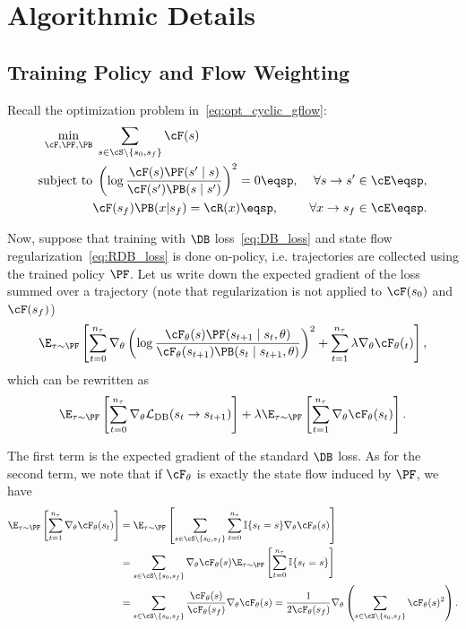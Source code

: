 \section{Algorithmic Details}\label{app:algo_details}

\subsection{Training Policy and Flow Weighting}\label{app:flow_weighting}


Recall the optimization problem in~\eqref{eq:opt_cyclic_gflow}:
\begin{align*}
\label{eq:opt_cyclic_gflow}
\min\limits_{\cF, \PF, \PB} &\; \sum\limits_{s \in \cS \setminus \{s_0, s_f\}} \cF(s) \\
\text{subject to}&\; \left( \log\frac{\cF(s)\PF(s' \mid s)}{\cF(s')\PB(s \mid s')}\right)^2 = 0\eqsp, & \forall s \to s' \in \cE \eqsp, \notag \\
& \cF(s_f) \PB(x | s_f) = \cR(x)\eqsp,&  \forall x \to s_f \in \cE\eqsp.\notag
\end{align*}

Now, suppose that training with $\DB$ loss~\eqref{eq:DB_loss} and state flow regularization~\eqref{eq:RDB_loss} is done on-policy, i.e. trajectories are collected using the trained policy $\PF$. Let us write down the expected gradient of the loss summed over a trajectory (note that regularization is not applied to $\cF(s_0)$ and $\cF(s_f)$)
$$
\E_{\tau \sim \PF}\left[\sum_{t = 0}^{n_\tau} \nabla_\theta \left(\log \frac{\cF_{\theta}(s) \PF(s_{t+1} \mid s_t, \theta)}{\cF_{\theta}(s_{t+1})\PB(s_t \mid s_{t+1}, \theta)} \right)^2 + \sum_{t = 1}^{n_\tau} \lambda \nabla_\theta \cF_\theta(_t)\right],
$$
which can be rewritten as
$$
\E_{\tau \sim \PF}\left[\sum_{t = 0}^{n_\tau} \nabla_\theta \mathcal{L}_{\mathrm{DB}}(s_t \to s_{t+1}) \right] + \lambda \E_{\tau \sim \PF}\left[\sum_{t = 1}^{n_\tau} \nabla_\theta \cF_\theta(s_t) \right].
$$

The first term is the expected gradient of the standard $\DB$ loss. As for the second term, we note that if $\cF_{\theta}$ is exactly the state flow induced by $\PF$, we have
\begin{equation*} %
\begin{split}
\E_{\tau \sim \PF}\left[\sum_{t = 1}^{n_\tau} \nabla_\theta \cF_\theta(s_t) \right] & = \E_{\tau \sim \PF}\left[\sum_{s \in \cS \setminus \{s_0, s_f\}} \sum_{t = 0}^{n_\tau} \mathbb{I}\{s_t = s\} \nabla_\theta \cF_\theta(s)  \right]  \\
& = \sum_{s \in \cS \setminus \{s_0, s_f\}} \nabla_\theta \cF_\theta(s) \E_{\tau \sim \PF}\left[\sum_{t = 0}^{n_\tau} \mathbb{I}\{s_t = s\} \right]  \\
& = \sum_{s \in \cS \setminus \{s_0, s_f\}} \frac{\cF_{\theta}(s)}{\cF_\theta(s_f)}\nabla_\theta \cF_\theta(s) = \frac{1}{2\cF_\theta(s_f)} \nabla_\theta \left( \sum_{s \in \cS \setminus \{s_0, s_f\}} \cF_{\theta}(s)^2 \right).
\end{split}
\end{equation*}

